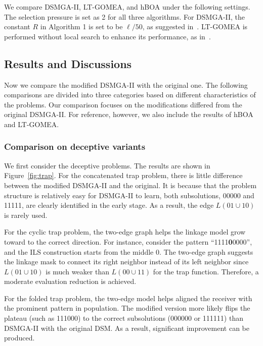 We compare DSMGA-II, LT-GOMEA, and hBOA under the following settings. 
The selection pressure is set as 2 for all three algorithms. 
For DSMGA-II, the constant $R$ in Algorithm 1 is set to be $\ell/50$, as suggested in~\cite{hsu:DSMGA2}.
LT-GOMEA is performed without local search to enhance its performance, as in~\cite{bosman:LT-GOMEA}.




\subsection{Results and Discussions}

Now we compare the modified DSMGA-II with the original one. The following comparisons are divided into three categories based on different characteristics of the problems. Our comparison focuses on the modifications differed from the original DSMGA-II. For reference, however, we also include the results of hBOA and LT-GOMEA. 

\subsubsection{ Comparison on deceptive variants }


We first consider the deceptive problems. The results are shown in Figure~\ref{fig:trap}.
For the concatenated trap problem, there is little difference between the modified DSMGA-II and the original. It is because that the problem structure is relatively easy for DSMGA-II to learn, both subsolutions, 00000 and 11111, are clearly identified in the early stage. As a result, the edge $L(01\cup10)$ is rarely used. 


For the cyclic trap problem, the two-edge graph helps the linkage model grow toward to the correct direction. For instance, consider the pattern ``1111\textbf{0}0000'', and the ILS construction starts from the middle 0. The two-edge graph suggests the linkage mask to connect its right neighbor instead of its left neighbor since $L(01\cup10)$ is much weaker than $L(00\cup11)$ for the trap function. Therefore, a moderate evaluation reduction is achieved. 

For the folded trap problem, the two-edge model helps aligned the receiver with the prominent pattern in population. The modified version more likely flips the plateau (such as 111000) to the correct subsolutions (000000 or 111111) than DSMGA-II with the original DSM. As a result, significant improvement can be produced. 



